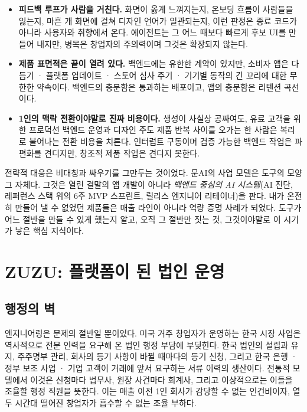 \documentclass{article}
\begin{document}
\begin{itemize}
    \item \textbf{피드백 루프가 사람을 거친다.} 화면이 옳게 느껴지는지, 온보딩 흐름이 사람들을 잃는지, 마흔 개 화면에 걸쳐 디자인 언어가 일관되는지, 이런 판정은 종료 코드가 아니라 사용자와 취향에서 온다. 에이전트는 그 어느 때보다 빠르게 후보 UI를 만들어 내지만, 병목은 창업자의 주의력이며 그것은 확장되지 않는다.
    \item \textbf{제품 표면적은 끝이 열려 있다.} 백엔드에는 유한한 계약이 있지만, 소비자 앱은 다듬기 · 플랫폼 업데이트 · 스토어 심사 주기 · 기기별 동작의 긴 꼬리에 대한 무한한 약속이다. 백엔드의 충분함은 통과하는 배포이고, 앱의 충분함은 리텐션 곡선이다.
    \item \textbf{1인의 맥락 전환이야말로 진짜 비용이다.} 생성이 사실상 공짜여도, 유료 고객을 위한 프로덕션 백엔드 운영과 디자인 주도 제품 반복 사이를 오가는 한 사람은 복리로 불어나는 전환 비용을 치른다. 인터럽트 구동이며 검증 가능한 백엔드 작업은 파편화를 견디지만, 창조적 제품 작업은 견디지 못한다.
\end{itemize}

전략적 대응은 비대칭과 싸우기를 그만두는 것이었다. 문AI의 사업 모델은 도구의 모양 그 자체다. 그것은 열린 결말의 앱 개발이 아니라 \emph{백엔드 중심의 AI 시스템}(AI 진단, 레퍼런스 스택 위의 6주 MVP 스프린트, 릴리스 엔지니어 리테이너)을 판다. 내가 온전히 만들어 낼 수 없었던 제품들은 매출 라인이 아니라 역량 증명 사례가 되었다. 도구가 어느 절반을 만들 수 있게 했는지 알고, 오직 그 절반만 짓는 것, 그것이야말로 이 시기가 낳은 핵심 지식이다.

\section{ZUZU: 플랫폼이 된 법인 운영}

\subsection{행정의 벽}

엔지니어링은 문제의 절반일 뿐이었다. 미국 거주 창업자가 운영하는 한국 시장 사업은 역사적으로 전문 인력을 요구해 온 법인 행정 부담에 부딪힌다. 한국 법인의 설립과 유지, 주주명부 관리, 회사의 등기 사항이 바뀔 때마다의 등기 신청, 그리고 한국 은행 · 정부 보조 사업 · 기업 고객이 거래에 앞서 요구하는 서류 이력의 생산이다. 전통적 모델에서 이것은 신청마다 법무사, 원장 사건마다 회계사, 그리고 이상적으로는 이들을 조율할 행정 직원을 뜻한다. 이는 매출 이전 1인 회사가 감당할 수 없는 인건비이자, 열두 시간대 떨어진 창업자가 흡수할 수 없는 조율 부하다.
\end{document}
